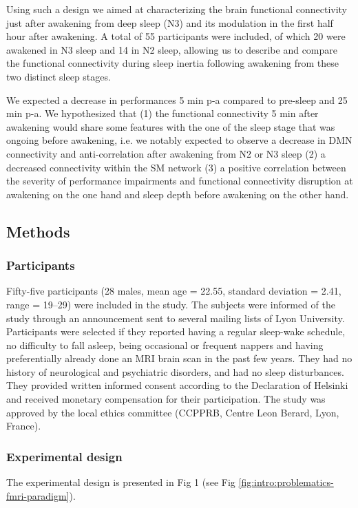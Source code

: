 Using such a design we aimed at characterizing the brain functional connectivity just after awakening from deep sleep (N3) and its modulation in the first half hour after awakening. A total of 55 participants were included, of which 20 were awakened in N3 sleep and 14 in N2 sleep, allowing us to describe and compare the functional connectivity during sleep inertia following awakening from these two distinct sleep stages.

We expected a decrease in performances 5 min p-a compared to pre-sleep and 25 min p-a. We hypothesized that (1) the functional connectivity 5 min after awakening would share some features with the one of the sleep stage that was ongoing before awakening, i.e. we notably expected to observe a decrease in DMN connectivity and anti-correlation after awakening from N2 or N3 sleep (2) a decreased connectivity within the SM network (3) a positive correlation between the severity of performance impairments and functional connectivity disruption at awakening on the one hand and sleep depth before awakening on the other hand.

\subsection*{Methods}
\label{res:inertia:inertia:methods}

\subsubsection*{Participants}
Fifty-five participants (28 males, mean age = 22.55, standard deviation = 2.41, range = 19–29) were included in the study. The subjects were informed of the study through an announcement sent to several mailing lists of Lyon University. Participants were selected if they reported having a regular sleep-wake schedule, no difficulty to fall asleep, being occasional or frequent nappers and having preferentially already done an MRI brain scan in the past few years. They had no history of neurological and psychiatric disorders, and had no sleep disturbances. They provided written informed consent according to the Declaration of Helsinki and received monetary compensation for their participation. The study was approved by the local ethics committee (CCPPRB, Centre Leon Berard, Lyon, France).

\subsubsection*{Experimental design}
The experimental design is presented in Fig 1 (see Fig \ref{fig:intro:problematics-fmri-paradigm}).

